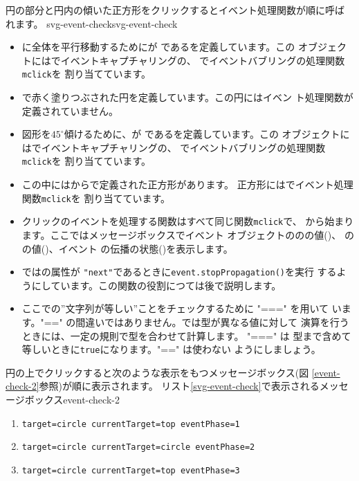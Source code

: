 円の部分と円内の傾いた正方形をクリックするとイベント処理関数が順に呼ば
れます。%
{}
    {svg-event-check}{svg-event-check}
\begin{itemize}
 \item {}に全体を平行移動するためにが
       であるを定義しています。この
       オブジェクトにはでイベントキャプチャリングの、
       でイベントバブリングの処理関数\texttt{mclick}を
       割り当てています。
 \item {}で赤く塗りつぶされた円を定義しています。この円にはイベン
       ト処理関数が定義されていません。
 \item 図形を$45^\circ$傾けるために、が
       であるを定義しています。この
       オブジェクトにはでイベントキャプチャリングの、
       でイベントバブリングの処理関数\texttt{mclick}を
       割り当てています。
 \item この中にはからで定義された正方形があります。
       正方形にはでイベント処理関数\texttt{mclick}を
       割り当てています。
 \item クリックのイベントを処理する関数はすべて同じ関数\texttt{mclick}で、
       から始まります。ここではメッセージボックスでイベント
       オブジェクトののの値()、
       のの値()、イベント
       の伝播の状態()を表示します。
 \item {}ではの属性が
       \texttt{"next"}であるときに\texttt{event.stopPropagation()}を実行
       するようにしています。この関数の役割につては後で説明します。
 \item ここでの”文字列が等しい”ことをチェックするために "===" を用いて
       います。"==" の間違いではありません。\JS では型が異なる値に対して
       演算を行うときには、一定の規則で型を合わせて計算します。 "===" は
       型まで含めて等しいときに\texttt{true}になります。"==" は使わない
       ようにしましょう。
\end{itemize}
円の上でクリックすると次のような表示をもつメッセージボックス(図
\ref{event-check-2}参照)が順に表示されます。
{リスト\ref{svg-event-check}で表示されるメッセージボックス}{event-check-2}
\begin{enumerate}
 \item \texttt{target=circle currentTarget=top eventPhase=1}
 \item \texttt{target=circle currentTarget=circle eventPhase=2}
 \item \texttt{target=circle currentTarget=top eventPhase=3}
\end{enumerate}
